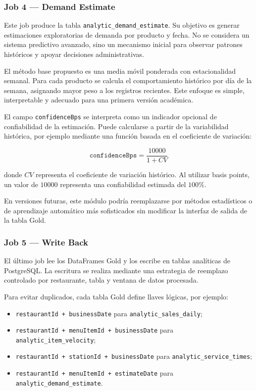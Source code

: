 \subsubsection{Job 4 --- Demand Estimate}

Este job produce la tabla \texttt{analytic\_demand\_estimate}. Su objetivo es generar
estimaciones exploratorias de demanda por producto y fecha. No se considera un sistema
predictivo avanzado, sino un mecanismo inicial para observar patrones históricos y apoyar
decisiones administrativas.

El método base propuesto es una media móvil ponderada con estacionalidad semanal. Para
cada producto se calcula el comportamiento histórico por día de la semana, asignando mayor
peso a los registros recientes. Este enfoque es simple, interpretable y adecuado para una
primera versión académica.

El campo \texttt{confidenceBps} se interpreta como un indicador opcional de confiabilidad
de la estimación. Puede calcularse a partir de la variabilidad histórica, por ejemplo
mediante una función basada en el coeficiente de variación:

\[
  \texttt{confidenceBps} = \frac{10000}{1 + CV}
\]

donde $CV$ representa el coeficiente de variación histórico. Al utilizar basis points,
un valor de $10000$ representa una confiabilidad estimada del $100\%$.

En versiones futuras, este módulo podría reemplazarse por métodos estadísticos o de
aprendizaje automático más sofisticados sin modificar la interfaz de salida de la tabla
Gold.

\subsubsection{Job 5 --- Write Back}

El último job lee los DataFrames Gold y los escribe en tablas analíticas de PostgreSQL.
La escritura se realiza mediante una estrategia de reemplazo controlado por restaurante,
tabla y ventana de datos procesada.

Para evitar duplicados, cada tabla Gold define llaves lógicas, por ejemplo:

\begin{itemize}[leftmargin=1.5em]
  \item \texttt{restaurantId + businessDate} para \texttt{analytic\_sales\_daily};
  \item \texttt{restaurantId + menuItemId + businessDate} para \texttt{analytic\_item\_velocity};
  \item \texttt{restaurantId + stationId + businessDate} para \texttt{analytic\_service\_times};
  \item \texttt{restaurantId + menuItemId + estimateDate} para \texttt{analytic\_demand\_estimate}.
\end{itemize}

